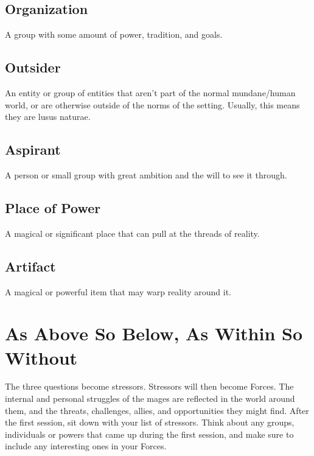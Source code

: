 \documentclass[
  oneside,
  statementpaper,
  9pt]{memoir}
\begin{document}
\hypertarget{organization}{%
\subsection{Organization}\label{organization}}

A group with some amount of power, tradition, and goals.

\hypertarget{outsider}{%
\subsection{Outsider}\label{outsider}}

An entity or group of entities that aren't part of the normal
mundane/human world, or are otherwise outside of the norms of the
setting. Usually, this means they are lusus naturae.

\hypertarget{aspirant}{%
\subsection{Aspirant}\label{aspirant}}

A person or small group with great ambition and the will to see it
through.

\hypertarget{place-of-power-1}{%
\subsection{Place of Power}\label{place-of-power-1}}

A magical or significant place that can pull at the threads of reality.

\hypertarget{artifact}{%
\subsection{Artifact}\label{artifact}}

A magical or powerful item that may warp reality around it.

\hypertarget{as-above-so-below-as-within-so-without}{%
\section{As Above So Below, As Within So
Without}\label{as-above-so-below-as-within-so-without}}

The three questions become stressors. Stressors will then become Forces.
The internal and personal struggles of the mages are reflected in the
world around them, and the threats, challenges, allies, and
opportunities they might find. After the first session, sit down with
your list of stressors. Think about any groups, individuals or powers
that came up during the first session, and make sure to include any
interesting ones in your Forces.
\end{document}
